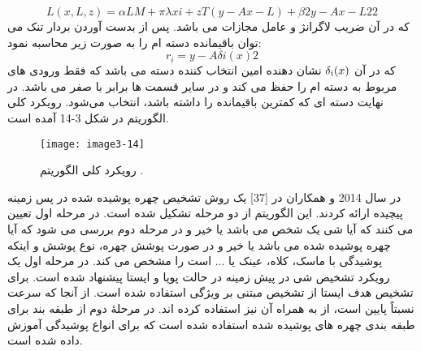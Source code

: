\begin{equation}\label{eq3-13}
L(x,L,z)=\alpha LM+πλxi+zT(y-Ax-L)+β2y-Ax-L22
\end{equation}
\noindent‏
که در آن  ضریب لاگرانژ و  عامل مجازات می باشد. پس از بدست آوردن بردار تنک  می توان باقیمانده دسته  ام را به صورت زیر محاسبه نمود:
\begin{equation}\label{eq3-14}
r_i=y-Aδi(x)2
\end{equation}‏
\noindent‏
که در آن
$\delta \textsubscript{i}(x)$
نشان دهنده  امین انتخاب کننده دسته می باشد که فقط ورودی های مربوط به دسته  ام را حفظ می کند و در سایر قسمت ها برابر با صفر می باشد. در نهایت دسته ای که کمترین باقیمانده را داشته باشد، انتخاب می‌شود. رویکرد کلی الگوریتم در شکل 3-14 آمده است.
 \begin{figure}[h]
\centering
  \texttt{[image: image3-14]}
  \caption{رویکرد کلی الگوریتم  \cite{ref1}.}
  \label{image2-1}
\end{figure}
\noindent
در سال 2014  و همکاران در [37] یک روش تشخیص چهره پوشیده شده در پس زمینه پیچیده ارائه کردند. این الگوریتم از دو مرحله تشکیل شده است. در مرحله اول تعیین می کنند که آیا شی یک شخص می باشد یا خیر و در مرحله دوم بررسی می شود که آیا چهره پوشیده شده می باشد یا خیر و در صورت پوشش چهره، نوع پوشش و اینکه پوشیدگی با ماسک، کلاه، عینک یا ... است را مشخص می کند.
در مرحله اول یک رویکرد تشخیص شی در پیش زمینه در حالت پویا و ایستا پیشنهاد شده است. برای تشخیص هدف ایستا از تشخیص مبتنی بر ویژگی  استفاده شده است. از آنجا که سرعت  نسبتاً پایین است، از  به همراه آن نیز استفاده کرده اند. 
در مرحلۀ دوم از طبقه بند  برای طبقه بندی چهره های پوشیده شده استفاده شده است که برای انواع پوشیدگی آموزش داده شده است.
